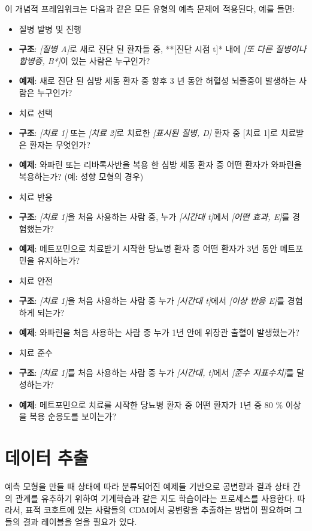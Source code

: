 \documentclass[11pt]{book}
\providecommand{\tightlist}{%
  \setlength{\itemsep}{0pt}\setlength{\parskip}{0pt}}
\theoremstyle{definition}
\theoremstyle{definition}
\theoremstyle{definition}
\theoremstyle{remark}
\begin{document}
이 개념적 프레임워크는 다음과 같은 모든 유형의 예측 문제에 적용된다,
예를 들면:

\begin{itemize}
\tightlist
\item
  질병 발병 및 진행
\item
  \textbf{구조}: \emph{{[}질병 A{]}}로 새로 진단 된 환자들 중, **{[}진단
  시점 t{]}* 내에 \emph{{[}또 다른 질병이나 합병증, B*{]}}이 있는 사람은
  누구인가?
\item
  \textbf{예제}: 새로 진단 된 심방 세동 환자 중 향후 3 년 동안 허혈성
  뇌졸중이 발생하는 사람은 누구인가?
\item
  치료 선택
\item
  \textbf{구조}: \emph{{[}치료 1{]}} 또는 \emph{{[}치료 2{]}}로 치료한
  \emph{{[}표시된 질병, D{]}} 환자 중 {[}치료 1{]}로 치료받은 환자는
  무엇인가?
\item
  \textbf{예제}: 와파린 또는 리바록사반을 복용 한 심방 세동 환자 중 어떤
  환자가 와파린을 복용하는가? (예: 성향 모형의 경우)
\item
  치료 반응
\item
  \textbf{구조}: \emph{{[}치료 1{]}}을 처음 사용하는 사람 중, 누가
  \emph{{[}시간대 t{]}}에서 \emph{{[}어떤 효과, E{]}}를 경험했는가?
\item
  \textbf{예제}: 메트포민으로 치료받기 시작한 당뇨병 환자 중 어떤 환자가
  3년 동안 메트포민을 유지하는가?
\item
  치료 안전
\item
  \textbf{구조}: \emph{{[}치료 1{]}}을 처음 사용하는 사람 중 누가
  \emph{{[}시간대 t{]}}에서 \emph{{[}이상 반응 E{]}}를 경험하게 되는가?
\item
  \textbf{예제}: 와파린을 처음 사용하는 사람 중 누가 1년 안에 위장관
  출혈이 발생했는가?
\item
  치료 준수
\item
  \textbf{구조}: \emph{{[}치료 1{]}}를 처음 사용하는 사람 중 누가
  \emph{{[}시간대, t{]}}에서 \emph{{[}준수 지표수치{]}}를 달성하는가?
\item
  \textbf{예제}: 메트포민으로 치료를 시작한 당뇨병 환자 중 어떤 환자가
  1년 중 80 \% 이상을 복용 순응도를 보이는가?
\end{itemize}

\section{데이터 추출}\label{-}

예측 모형을 만들 때 상태에 따라 분류되어진 예제들 기반으로 공변량과 결과
상태 간의 관계를 유추하기 위하여 기계학습과 같은 지도 학습이라는
프로세스를 사용한다. 따라서, 표적 코호트에
있는 사람들의 CDM에서 공변량을 추출하는 방법이 필요하며 그들의 결과
레이블을 얻을 필요가 있다.
\end{document}
